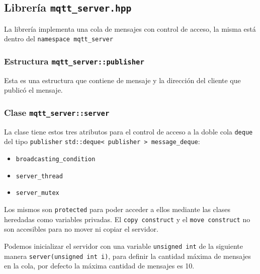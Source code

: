 \subsection{Librería \texttt{mqtt\_server.hpp}}

La librería implementa una cola de mensajes con control de acceso, la misma está dentro del \texttt{namespace mqtt\_server}
\subsubsection{Estructura \texttt{mqtt\_server::publisher}}

Esta es una estructura que contiene de mensaje y la dirección del cliente que publicó el mensaje.

\subsubsection{Clase \texttt{mqtt\_server::server}}

La clase tiene estos tres atributos para el control de acceso a la doble cola \verb|deque| del tipo \verb|publisher| \verb|std::deque< publisher > message_deque|:

\begin{itemize}
    \item \verb|broadcasting_condition| 
    \item \verb|server_thread|
    \item \verb|server_mutex|
\end{itemize}
Los mismos son \verb|protected| para poder acceder a ellos mediante las clases  heredadas como variables privadas. El \texttt{copy construct} y el \texttt{move construct} no son accesibles para no mover ni copiar el servidor.

Podemos inicializar el servidor con una variable \verb|unsigned int| de la siguiente manera \verb|server(unsigned int i)|, para definir la cantidad máxima de mensajes en la cola, por defecto la máxima cantidad de mensajes es 10.

